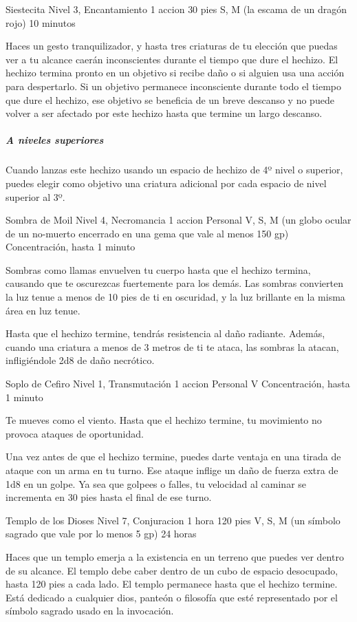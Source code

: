 \documentclass[a4paper,twocolumn,openany,10pt]{dndbook}
\begin{document}
\spellheader%
	{Siestecita}
	{Nivel 3, Encantamiento}
	{1 accion}
	{30 pies}
	{S, M (la escama de un dragón rojo)}
	{10 minutos}
	
	Haces un gesto tranquilizador, y hasta tres criaturas de tu elección que puedas ver a tu alcance caerán inconscientes
	durante el tiempo que dure el hechizo. El hechizo termina pronto en un objetivo si recibe daño o si alguien usa una acción
	para despertarlo. Si un objetivo permanece inconsciente durante todo el tiempo que dure el hechizo, ese objetivo se
	beneficia de un breve descanso y no puede volver a ser afectado por este hechizo hasta que termine un largo descanso.

	\subparagraph{A niveles superiores} Cuando lanzas este hechizo usando un espacio de hechizo de 4º nivel o superior, puedes
	elegir como objetivo una criatura adicional por cada espacio de nivel superior al 3º. 

\spellheader%
	{Sombra de Moil}
	{Nivel 4, Necromancia}
	{1 accion}
	{Personal}
	{V, S, M (un globo ocular de un no-muerto encerrado en una gema que vale al menos 150 gp)}
	{Concentración, hasta 1 minuto}
	
	Sombras como llamas envuelven tu cuerpo hasta que el hechizo termina, causando que te oscurezcas fuertemente para los demás.
	Las sombras convierten la luz tenue a menos de 10 pies de ti en oscuridad, y la luz brillante en la misma área en luz tenue.
	
	Hasta que el hechizo termine, tendrás resistencia al daño radiante. Además, cuando una criatura a menos de 3 metros de ti te
	ataca, las sombras la atacan, infligiéndole 2d8 de daño necrótico. 

\spellheader%
	{Soplo de Cefiro}
	{Nivel 1, Transmutación}
	{1 accion}
	{Personal}
	{V}
	{Concentración, hasta 1 minuto}
	
	Te mueves como el viento. Hasta que el hechizo termine, tu movimiento no provoca ataques de oportunidad.
	
	Una vez antes de que el hechizo termine, puedes darte ventaja en una tirada de ataque con un arma en tu turno. Ese ataque
	inflige un daño de fuerza extra de 1d8 en un golpe. Ya sea que golpees o falles, tu velocidad al caminar se incrementa en 30
	pies hasta el final de ese turno. 

\spellheader%
	{Templo de los Dioses}
	{Nivel 7, Conjuracion}
	{1 hora}
	{120 pies}
	{V, S, M (un símbolo sagrado que vale por lo menos 5 gp)}
	{24 horas}
	
	Haces que un templo emerja a la existencia en un terreno que puedes ver dentro de su alcance. El templo debe caber dentro de
	un cubo de espacio desocupado, hasta 120 pies a cada lado. El templo permanece hasta que el hechizo termine. Está dedicado a
	cualquier dios, panteón o filosofía que esté representado por el símbolo sagrado usado en la invocación.
	
\end{document}
